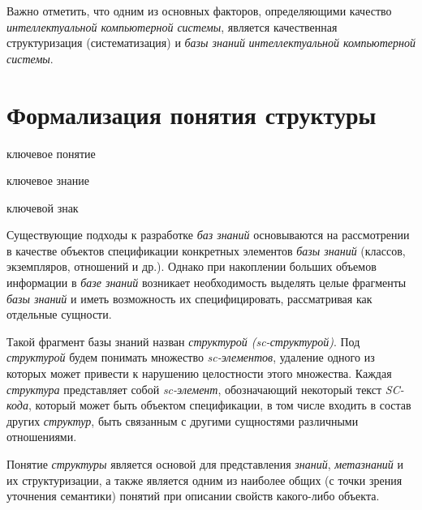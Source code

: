 Важно отметить, что одним из основных факторов, определяющими качество \textit{интеллектуальной компьютерной системы}, является качественная структуризация (систематизация) и  \textit{базы знаний} \textit{интеллектуальной компьютерной системы}.


\section{Формализация понятия структуры}
\label{sec_structure}

\begin{SCn}
	\begin{scnrelfromlist}{ключевое понятие}
	\end{scnrelfromlist}
\end{SCn}

\begin{SCn}
	\begin{scnrelfromlist}{ключевое знание}
	\end{scnrelfromlist}
\end{SCn}

\begin{SCn}
	\begin{scnrelfromlist}{ключевой знак}
	\end{scnrelfromlist}
\end{SCn}

Существующие подходы к разработке \textit{баз знаний} основываются на рассмотрении в качестве объектов спецификации конкретных элементов \textit{базы знаний} (классов, экземпляров, отношений и др.). Однако при накоплении больших объемов информации в \textit{базе знаний} возникает необходимость выделять целые фрагменты \textit{базы знаний} и иметь возможность их специфицировать, рассматривая как отдельные сущности. 

Такой фрагмент базы знаний назван \textit{структурой (sc-структурой)}. Под \textit{структурой} будем понимать множество \textit{sc-элементов}, удаление одного из которых может привести к нарушению целостности этого множества. Каждая \textit{структура} представляет собой \textit{sc-элемент}, обозначающий некоторый текст \textit{SC-кода}, который может быть объектом спецификации, в том числе входить в состав других \textit{структур}, быть связанным с другими сущностями различными отношениями. 

Понятие \textit{структуры} является основой для представления \textit{знаний}, \textit{метазнаний} и их структуризации, а также является одним из наиболее общих (с точки зрения уточнения семантики) понятий при описании свойств какого-либо объекта. 

